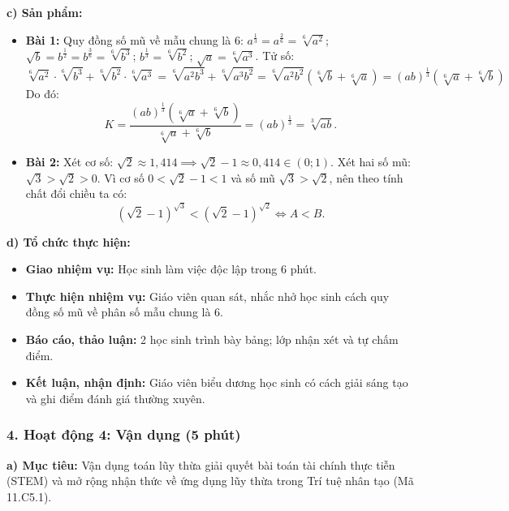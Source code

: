 \documentclass[12pt, a4paper]{article}
\begin{document}
\noindent \textbf{c) Sản phẩm:}
\begin{itemize}
    \item \textbf{Bài 1:}
    Quy đồng số mũ về mẫu chung là $6$:
    $a^{\frac{1}{3}} = a^{\frac{2}{6}} = \sqrt[6]{a^2}$; $\sqrt{b} = b^{\frac{1}{2}} = b^{\frac{3}{6}} = \sqrt[6]{b^3}$;
    $b^{\frac{1}{3}} = \sqrt[6]{b^2}$; $\sqrt{a} = \sqrt[6]{a^3}$.
    Tử số:
    $$\sqrt[6]{a^2} \cdot \sqrt[6]{b^3} + \sqrt[6]{b^2} \cdot \sqrt[6]{a^3} = \sqrt[6]{a^2 b^3} + \sqrt[6]{a^3 b^2} = \sqrt[6]{a^2 b^2}\left(\sqrt[6]{b} + \sqrt[6]{a}\right) = (ab)^{\frac{1}{3}} \left(\sqrt[6]{a} + \sqrt[6]{b}\right)$$
    Do đó:
    $$K = \dfrac{(ab)^{\frac{1}{3}} \left(\sqrt[6]{a} + \sqrt[6]{b}\right)}{\sqrt[6]{a} + \sqrt[6]{b}} = (ab)^{\frac{1}{3}} = \sqrt[3]{ab}.$$
    \item \textbf{Bài 2:}
    Xét cơ số: $\sqrt{2} \approx 1{,}414 \implies \sqrt{2} - 1 \approx 0{,}414 \in (0; 1)$.
    Xét hai số mũ: $\sqrt{3} > \sqrt{2} > 0$.
    Vì cơ số $0 < \sqrt{2} - 1 < 1$ và số mũ $\sqrt{3} > \sqrt{2}$, nên theo tính chất đổi chiều ta có:
    $$(\sqrt{2} - 1)^{\sqrt{3}} < (\sqrt{2} - 1)^{\sqrt{2}} \iff A < B.$$
\end{itemize}

\noindent \textbf{d) Tổ chức thực hiện:}
\begin{itemize}[leftmargin=0.6cm]
    \item \textbf{Giao nhiệm vụ:} Học sinh làm việc độc lập trong 6 phút.
    \item \textbf{Thực hiện nhiệm vụ:} Giáo viên quan sát, nhắc nhở học sinh cách quy đồng số mũ về phân số mẫu chung là $6$.
    \item \textbf{Báo cáo, thảo luận:} 2 học sinh trình bày bảng; lớp nhận xét và tự chấm điểm.
    \item \textbf{Kết luận, nhận định:} Giáo viên biểu dương học sinh có cách giải sáng tạo và ghi điểm đánh giá thường xuyên.
\end{itemize}

\subsubsection*{4. Hoạt động 4: Vận dụng (5 phút)}

\noindent \textbf{a) Mục tiêu:}
Vận dụng toán lũy thừa giải quyết bài toán tài chính thực tiễn (STEM) và mở rộng nhận thức về ứng dụng lũy thừa trong Trí tuệ nhân tạo (Mã 11.C5.1).
\end{document}
